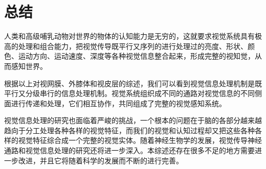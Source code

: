 \documentclass[a4paper,10pt]{article}\large
\begin{document}
\section{总结}



人类和高级哺乳动物对世界的物体的认知能力是无穷的\cite{15:book}，这就要求视觉系统具有极高的处理和组合能力，把视觉传导既平行又序列的进行处理过的亮度、形状、颜色、运动方向、运动速度、深度等各种视觉信息整合起来，形成完整的视知觉，从而感知世界。
        

根据以上对视网膜、外膝体和视皮层的综述，我们可以看到视觉信息处理机制是既平行又分级串行的信息处理机制\cite{16:book}。视觉系统组织成不同的通路对视觉信息的不同侧面进行传递和处理，它们相互协作，共同组成了完整的视觉感知系统。
        


视觉信息处理的研究也面临着严峻的挑战，一个根本的问题在于脑的各部分越来越趋向于分工处理各种各样的视觉特征，而我们的视觉和认知过程却又把这些各种各样的视觉特征综合成一个完整的视觉实体\cite{17:book}。随着神经生物学的发展，视觉传导神经通路和视觉信息处理的研究还将进一步深入。本综述还存在很多不足的地方需要进一步改进，并且它将随着科学的发展而不断的进行完善。



\end{document}
